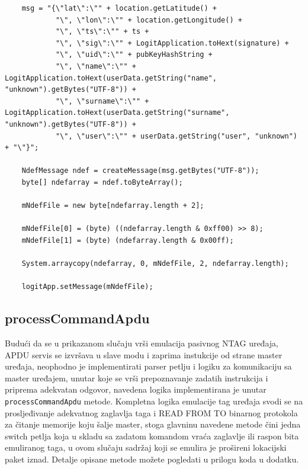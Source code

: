 \begin{verbatim}
    msg = "{\"lat\":\"" + location.getLatitude() +
            "\", \"lon\":\"" + location.getLongitude() +
            "\", \"ts\":\"" + ts +
            "\", \"sig\":\"" + LogitApplication.toHext(signature) +
            "\", \"uid\":\"" + pubKeyHashString +
            "\", \"name\":\"" + LogitApplication.toHext(userData.getString("name", "unknown").getBytes("UTF-8")) +
            "\", \"surname\":\"" + LogitApplication.toHext(userData.getString("surname", "unknown").getBytes("UTF-8")) +
            "\", \"user\":\"" + userData.getString("user", "unknown") + "\"}";

    NdefMessage ndef = createMessage(msg.getBytes("UTF-8"));
    byte[] ndefarray = ndef.toByteArray();

    mNdefFile = new byte[ndefarray.length + 2];

    mNdefFile[0] = (byte) ((ndefarray.length & 0xff00) >> 8);
    mNdefFile[1] = (byte) (ndefarray.length & 0x00ff);

    System.arraycopy(ndefarray, 0, mNdefFile, 2, ndefarray.length);

    logitApp.setMessage(mNdefFile);
\end{verbatim}

\subsection{processCommandApdu}
Budući da se u prikazanom slučaju vrši emulacija pasivnog NTAG uređaja, APDU servis se izvršava u slave modu i zaprima instukcije od strane master uređaja, neophodno je implementirati parser petlju i logiku za komunikaciju sa master uređajem, unutar koje se vrši prepoznavanje zadatih instrukcija i priprema adekvatan odgovor, navedena logika implementirana je unutar \texttt{processCommandApdu} metode. Kompletna logika emulacije tag uređaja svodi se na prosljeđivanje adekvatnog zaglavlja taga i READ FROM TO binarnog protokola za čitanje memorije koju šalje master, stoga glavninu navedene metode čini jedna switch petlja koja u skladu sa zadatom komandom vraća zaglavlje ili raspon bita emuliranog taga, u ovom slučaju sadržaj koji se emulira je prošireni lokacijski paket iznad. Detalje opisane metode možete pogledati u prilogu koda u dodatku.

